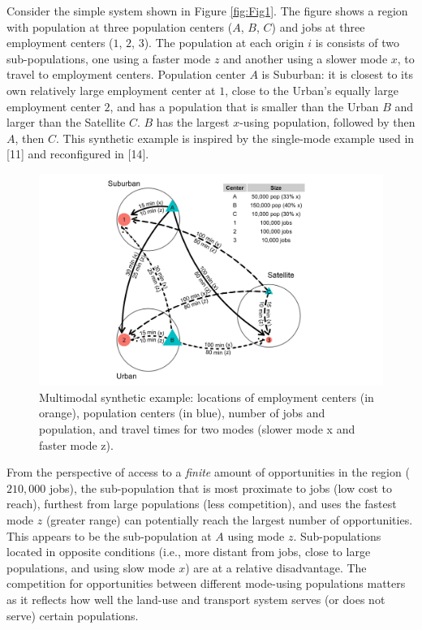 \documentclass[10pt,letterpaper]{article}
\begin{document}
Consider the simple system shown in Figure \ref{fig:Fig1}. The figure
shows a region with population at three population centers (\(A\),
\(B\), \(C\)) and jobs at three employment centers (\(1\), \(2\),
\(3\)). The population at each origin \(i\) is consists of two
sub-populations, one using a faster mode \(z\) and another using a
slower mode \(x\), to travel to employment centers. Population center
\(A\) is Suburban: it is closest to its own relatively large employment
center at \(1\), close to the Urban's equally large employment center
\(2\), and has a population that is smaller than the Urban \(B\) and
larger than the Satellite \(C\). \(B\) has the largest \(x\)-using
population, followed by then \(A\), then \(C\). This synthetic example
is inspired by the single-mode example used in {[}11{]} and reconfigured
in {[}14{]}.

\begin{figure}

{\centering \includegraphics[width=1\linewidth]{images/Fig1} 

}

\caption{\label{fig:Fig1} Multimodal synthetic example: locations of employment centers (in orange), population centers (in blue), number of jobs and population, and travel times for two modes (slower mode x and faster mode z).}\label{fig:synthetic-example-plot}
\end{figure}

From the perspective of access to a \emph{finite} amount of
opportunities in the region (\(210,000\) jobs), the sub-population that
is most proximate to jobs (low cost to reach), furthest from large
populations (less competition), and uses the fastest mode \(z\) (greater
range) can potentially reach the largest number of opportunities. This
appears to be the sub-population at \(A\) using mode \(z\).
Sub-populations located in opposite conditions (i.e., more distant from
jobs, close to large populations, and using slow mode \(x\)) are at a
relative disadvantage. The competition for opportunities between
different mode-using populations matters as it reflects how well the
land-use and transport system serves (or does not serve) certain
populations.
\end{document}
